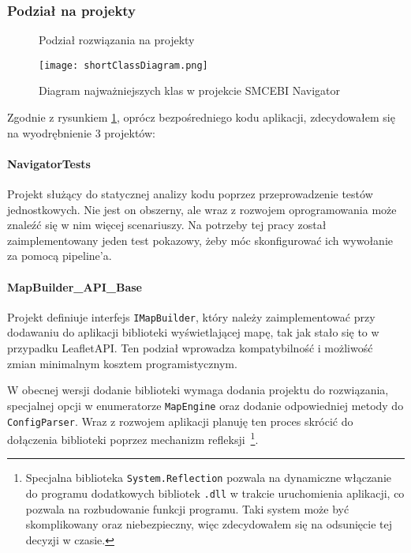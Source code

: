 \subsubsection{Podział na projekty}
\begin{figure}[!ht]
    \centering
    \caption{Podział rozwiązania na projekty}
    \label{img:projectDiagram}
\end{figure}


\begin{figure}[!hb]
    \centering
    \texttt{[image: shortClassDiagram.png]}
    \caption{Diagram najważniejszych klas w projekcie SMCEBI Navigator}
    \label{img:shortClassDiagram}
\end{figure}
\newpage
\restoregeometry

Zgodnie z rysunkiem \ref{img:projectDiagram}, oprócz bezpośredniego kodu aplikacji, 
zdecydowałem się na wyodrębnienie 3 projektów:

\paragraph{NavigatorTests}
Projekt służący do statycznej analizy kodu poprzez przeprowadzenie testów jednostkowych.
Nie jest on obszerny, ale wraz z rozwojem oprogramowania może znaleźć się w nim więcej 
scenariuszy. Na potrzeby tej pracy został zaimplementowany jeden test pokazowy, 
żeby móc skonfigurować ich wywołanie za pomocą pipeline'a.

\paragraph{MapBuilder\_API\_Base}
Projekt definiuje interfejs \verb|IMapBuilder|, który należy zaimplementować przy dodawaniu 
do aplikacji biblioteki wyświetlającej mapę, tak jak stało się to w przypadku LeafletAPI.
Ten podział wprowadza kompatybilność i możliwość zmian minimalnym kosztem programistycznym.

W obecnej wersji dodanie biblioteki wymaga dodania projektu do rozwiązania, specjalnej opcji w enumeratorze 
\verb|MapEngine| oraz dodanie odpowiedniej metody do \verb|ConfigParser|. Wraz z rozwojem aplikacji 
planuję ten proces skrócić do dołączenia biblioteki poprzez mechanizm refleksji~\cprotect\footnote{%
    Specjalna biblioteka \verb|System.Reflection| pozwala na dynamiczne włączanie do programu 
    dodatkowych bibliotek \verb|.dll| w trakcie uruchomienia aplikacji, co pozwala na rozbudowanie 
    funkcji programu. Taki system może być skomplikowany oraz niebezpieczny, więc zdecydowałem się 
    na odsunięcie tej decyzji w czasie.
}.

